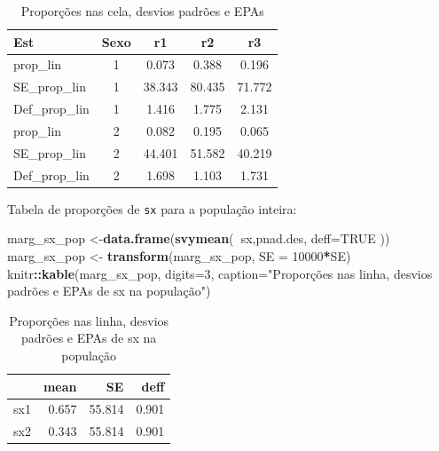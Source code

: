 \documentclass[]{book}
\newenvironment{Shaded}{\begin{snugshade}}{\end{snugshade}}
\newcommand{\KeywordTok}[1]{\textcolor[rgb]{0.13,0.29,0.53}{\textbf{#1}}}
\newcommand{\DataTypeTok}[1]{\textcolor[rgb]{0.13,0.29,0.53}{#1}}
\newcommand{\DecValTok}[1]{\textcolor[rgb]{0.00,0.00,0.81}{#1}}
\newcommand{\StringTok}[1]{\textcolor[rgb]{0.31,0.60,0.02}{#1}}
\newcommand{\OtherTok}[1]{\textcolor[rgb]{0.56,0.35,0.01}{#1}}
\newcommand{\OperatorTok}[1]{\textcolor[rgb]{0.81,0.36,0.00}{\textbf{#1}}}
\newcommand{\NormalTok}[1]{#1}
\theoremstyle{definition}
\theoremstyle{definition}
\theoremstyle{definition}
\theoremstyle{remark}
\begin{document}
\begin{table}

\caption{\label{tab:propcelas}Proporções nas cela, desvios padrões e EPAs}
\centering
\begin{tabular}[t]{lcccc}
\toprule
Est & Sexo & r1 & r2 & r3\\
\midrule
prop\_lin & 1 & 0.073 & 0.388 & 0.196\\
SE\_prop\_lin & 1 & 38.343 & 80.435 & 71.772\\
Def\_prop\_lin & 1 & 1.416 & 1.775 & 2.131\\
prop\_lin & 2 & 0.082 & 0.195 & 0.065\\
SE\_prop\_lin & 2 & 44.401 & 51.582 & 40.219\\
Def\_prop\_lin & 2 & 1.698 & 1.103 & 1.731\\
\bottomrule
\end{tabular}
\end{table}

Tabela de proporções de \texttt{sx} para a população inteira:

\begin{Shaded}
\begin{Highlighting}[]
\NormalTok{marg_sx_pop <-}\KeywordTok{data.frame}\NormalTok{(}\KeywordTok{svymean}\NormalTok{(}\OperatorTok{~}\NormalTok{sx,pnad.des, }\DataTypeTok{deff=}\OtherTok{TRUE}\NormalTok{ ))}
\NormalTok{marg_sx_pop <-}\StringTok{ }\KeywordTok{transform}\NormalTok{(marg_sx_pop, }\DataTypeTok{SE =} \DecValTok{10000}\OperatorTok{*}\NormalTok{SE)}
\NormalTok{knitr}\OperatorTok{::}\KeywordTok{kable}\NormalTok{(marg_sx_pop, }\DataTypeTok{digits=}\DecValTok{3}\NormalTok{,}
  \DataTypeTok{caption=}\StringTok{"Proporções nas linha, desvios padrões e EPAs de sx na população"}\NormalTok{)}
\end{Highlighting}
\end{Shaded}

\begin{table}

\caption{\label{tab:unnamed-chunk-3}Proporções nas linha, desvios padrões e EPAs de sx na população}
\centering
\begin{tabular}[t]{l|r|r|r}
\hline
  & mean & SE & deff\\
\hline
sx1 & 0.657 & 55.814 & 0.901\\
\hline
sx2 & 0.343 & 55.814 & 0.901\\
\hline
\end{tabular}
\end{table}
\end{document}
